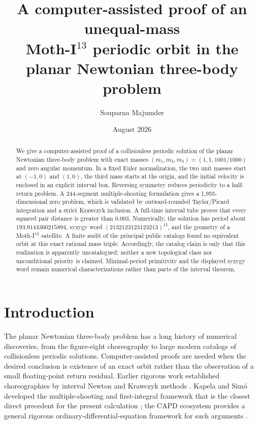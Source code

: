 \documentclass[11pt]{article}
\title{A computer-assisted proof of an unequal-mass\\
Moth-I$^{13}$ periodic orbit in the planar Newtonian three-body problem}
\author{Souparna Majumder}
\date{August 2026}
\begin{document}
\maketitle

\begin{abstract}
We give a computer-assisted proof of a collisionless periodic solution of the planar Newtonian three-body problem with exact masses
$(m_1,m_2,m_3)=(1,1,1001/1000)$ and zero angular momentum. In a fixed Euler normalization, the two unit masses start at $(-1,0)$ and $(1,0)$, the third mass starts at the origin, and the initial velocity is enclosed in an explicit interval box. Reversing symmetry reduces periodicity to a half-return problem. A 244-segment multiple-shooting formulation gives a 1,955-dimensional zero problem, which is validated by outward-rounded Taylor/Picard integration and a strict Krawczyk inclusion. A full-time interval tube proves that every squared pair distance is greater than $0.003$. Numerically, the solution has period about $193.9144360215894$, syzygy word $(2132123123123213)^{13}$, and the geometry of a Moth-I$^{13}$ satellite. A finite audit of the principal public catalogs found no equivalent orbit at this exact rational mass triple. Accordingly, the catalog claim is only that this realization is apparently uncatalogued; neither a new topological class nor unconditional priority is claimed. Minimal-period primitivity and the displayed syzygy word remain numerical characterizations rather than parts of the interval theorem.
\end{abstract}

\section{Introduction}

The planar Newtonian three-body problem has a long history of numerical discoveries, from the figure-eight choreography to large modern catalogs of collisionless periodic solutions. Computer-assisted proofs are needed when the desired conclusion is existence of an exact orbit rather than the observation of a small floating-point return residual. Earlier rigorous work established choreographies by interval Newton and Krawczyk methods \cite{kapela-zgliczynski-2003}. Kapela and Sim\'o developed the multiple-shooting and first-integral framework that is the closest direct precedent for the present calculation \cite{kapela-simo-2007}; the CAPD ecosystem provides a general rigorous ordinary-differential-equation framework for such arguments \cite{capd-2020}.
\end{document}
